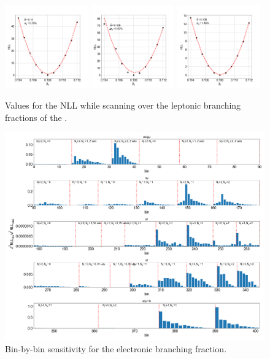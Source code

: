 \begin{figure}[h]
    \centering
    \includegraphics[width=0.32\textwidth]{chapters/Analysis/sectionStatisticalAnalysis/figures/beta_e}
    \includegraphics[width=0.32\textwidth]{chapters/Analysis/sectionStatisticalAnalysis/figures/beta_mu}
    \includegraphics[width=0.32\textwidth]{chapters/Analysis/sectionStatisticalAnalysis/figures/beta_tau}
    \caption{Values for the NLL while scanning over the leptonic
    branching fractions of the \PW.}
    \label{fig:beta_scan_1D}
\end{figure}

\begin{figure}[htb!]
    \centering
    \includegraphics[width=\textwidth]{chapters/Analysis/sectionStatisticalAnalysis/figures/beta_e_scan_bins_lh}
    \caption{Bin-by-bin sensitivity for the electronic branching fraction. }
    \label{fig:ele_scan_bins}
\end{figure}

